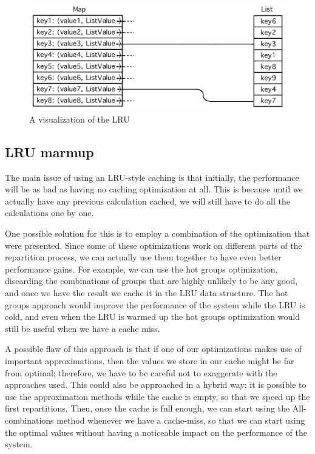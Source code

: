 \begin{figure}[!htb]
  \centering
  \includegraphics[width=\textwidth,height=\textheight,keepaspectratio]{img/lru.png}
  \caption{A visualization of the LRU}
  \label{fig:lru}
\end{figure}

\subsection{LRU marmup}\label{sec:warmup}
The main issue of using an LRU-style caching is that initially, the performance will be as bad as having no caching optimization at all. This is because until we actually have any previous calculation cached, we will still have to do all the calculations one by one. 

One possible solution for this is to employ a combination of the optimization that were presented. Since some of these optimizations work on different parts of the repartition process, we can actually use them together to have even better performance gains. For example, we can use the hot groups optimization, discarding the combinations of groups that are highly unlikely to be any good, and once we have the result we cache it in the LRU data structure. The hot groups approach would improve the performance of the system while the LRU is cold, and even when the LRU is warmed up the hot groups optimization would still be useful when we have a cache miss.

A possible flaw of this approach is that if one of our optimizations makes use of important approximations, then the values we store in our cache might be far from optimal; therefore, we have to be careful not to exaggerate with the approaches used. This could also be approached in a hybrid way; it is possible to use the approximation methods while the cache is empty, so that we speed up the first repartitions. Then, once the cache is full enough, we can start using the All-combinations method whenever we have a cache-miss, so that we can start using the optimal values without having a noticeable impact on the performance of the system.

